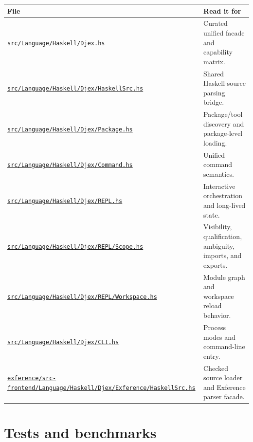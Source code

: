 \documentclass[10pt,letterpaper,oneside]{report}
\def\DjexBase{https://github.com/VladimirReshetnikov/Djex/blob/d3d9662598460316bdcd177ce6768c521e764aa8/}
\newcommand{\dpath}[1]{\href{\DjexBase#1}{\nolinkurl{#1}}}
\begin{document}
\begin{longtable}{@{}L{0.42\textwidth}L{0.50\textwidth}@{}}
\toprule
\textbf{File} & \textbf{Read it for} \\
\midrule
\endhead
\dpath{src/Language/Haskell/Djex.hs} & Curated unified facade and capability matrix. \\
\dpath{src/Language/Haskell/Djex/HaskellSrc.hs} & Shared Haskell-source parsing bridge. \\
\dpath{src/Language/Haskell/Djex/Package.hs} & Package/tool discovery and package-level loading. \\
\dpath{src/Language/Haskell/Djex/Command.hs} & Unified command semantics. \\
\dpath{src/Language/Haskell/Djex/REPL.hs} & Interactive orchestration and long-lived state. \\
\dpath{src/Language/Haskell/Djex/REPL/Scope.hs} & Visibility, qualification, ambiguity, imports, and exports. \\
\dpath{src/Language/Haskell/Djex/REPL/Workspace.hs} & Module graph and workspace reload behavior. \\
\dpath{src/Language/Haskell/Djex/CLI.hs} & Process modes and command-line entry. \\
\dpath{exference/src-frontend/Language/Haskell/Djex/Exference/HaskellSrc.hs} & Checked source loader and Exference parser facade. \\
\bottomrule
\end{longtable}

\section{Tests and benchmarks}
\end{document}
